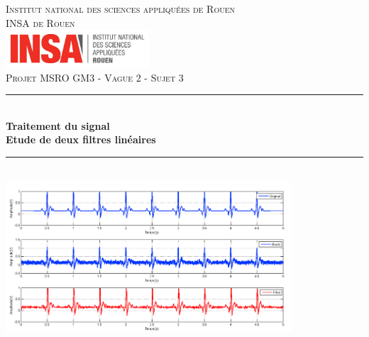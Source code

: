 \documentclass[12,french]{report}
\newcommand{\HRule}{\rule{\linewidth}{0.5mm}}
\begin{document}
\hypersetup{pdfborder=0 0 0}

\begin{titlepage}

\begin{center}
	\textsc{{\LARGE Institut national des sciences appliquées de Rouen} \\ 			\vspace{6mm} {\Large INSA de Rouen}} \\
	\vspace{5mm}
	\includegraphics[width=0.4\textwidth]{./Images/insa}\\[1.0 cm]

	\textsc{\Large Projet MSRO GM3 - Vague 2 - Sujet 3}\\[0.6cm]

	\HRule \\[0.1cm]
	{ \Huge \bfseries Traitement du signal \\ Etude de deux filtres linéaires}\\[0.2cm]
	\HRule \\[0.95cm]

	\includegraphics[width=0.8\textwidth]{./Images/Page_de_garde}\\[0.9 cm]


\end{center}
\end{titlepage}
\end{document}
